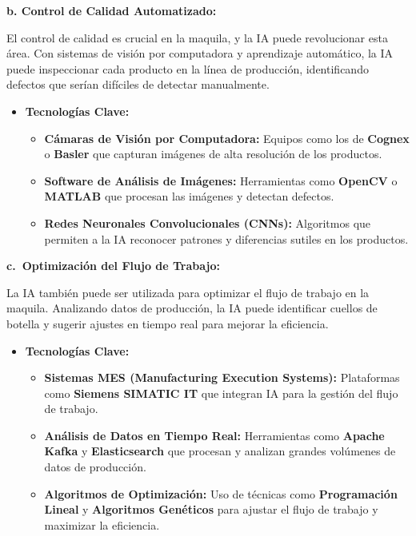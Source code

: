 \documentclass[
  10pt,
  letterpaper,
]{book}
\providecommand{\tightlist}{%
  \setlength{\itemsep}{0pt}\setlength{\parskip}{0pt}}\usepackage{longtable,booktabs,array}
\begin{document}
\textbf{b. Control de Calidad Automatizado:}

El control de calidad es crucial en la maquila, y la IA puede
revolucionar esta área. Con sistemas de visión por computadora y
aprendizaje automático, la IA puede inspeccionar cada producto en la
línea de producción, identificando defectos que serían difíciles de
detectar manualmente.

\begin{itemize}
\tightlist
\item
  \textbf{Tecnologías Clave:}

  \begin{itemize}
  \tightlist
  \item
    \textbf{Cámaras de Visión por Computadora:} Equipos como los de
    \textbf{Cognex} o \textbf{Basler} que capturan imágenes de alta
    resolución de los productos.
  \item
    \textbf{Software de Análisis de Imágenes:} Herramientas como
    \textbf{OpenCV} o \textbf{MATLAB} que procesan las imágenes y
    detectan defectos.
  \item
    \textbf{Redes Neuronales Convolucionales (CNNs):} Algoritmos que
    permiten a la IA reconocer patrones y diferencias sutiles en los
    productos.
  \end{itemize}
\end{itemize}

\textbf{c.~Optimización del Flujo de Trabajo:}

La IA también puede ser utilizada para optimizar el flujo de trabajo en
la maquila. Analizando datos de producción, la IA puede identificar
cuellos de botella y sugerir ajustes en tiempo real para mejorar la
eficiencia.

\begin{itemize}
\tightlist
\item
  \textbf{Tecnologías Clave:}

  \begin{itemize}
  \tightlist
  \item
    \textbf{Sistemas MES (Manufacturing Execution Systems):} Plataformas
    como \textbf{Siemens SIMATIC IT} que integran IA para la gestión del
    flujo de trabajo.
  \item
    \textbf{Análisis de Datos en Tiempo Real:} Herramientas como
    \textbf{Apache Kafka} y \textbf{Elasticsearch} que procesan y
    analizan grandes volúmenes de datos de producción.
  \item
    \textbf{Algoritmos de Optimización:} Uso de técnicas como
    \textbf{Programación Lineal} y \textbf{Algoritmos Genéticos} para
    ajustar el flujo de trabajo y maximizar la eficiencia.
  \end{itemize}
\end{itemize}
\end{document}
